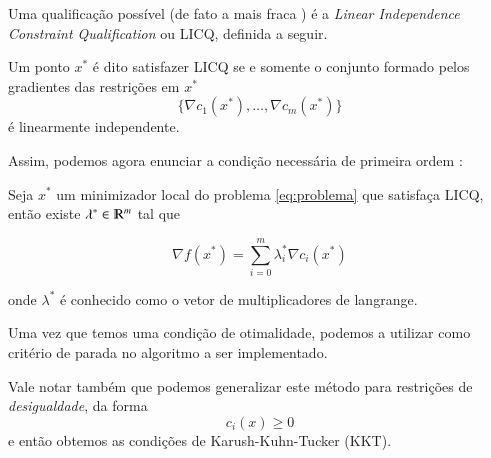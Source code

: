 Uma qualificação possível (de fato a mais fraca \citep{Wachsmuth201378}) é a
\emph{Linear Independence Constraint Qualification} ou LICQ, definida a seguir.

\begin{definition}
    Um ponto $x^*$ é dito satisfazer LICQ se e somente o conjunto formado pelos
    gradientes das restrições em $x^*$
    $$ \{ \nabla c_1(x^*), \dots, \nabla c_m(x^*)\} $$
    é linearmente independente.
\end{definition}

Assim, podemos agora enunciar a condição necessária de primeira ordem \citep{Friedlander94}:

\begin{theorem}
    Seja $x^*$ um minimizador local do problema \ref{eq:problema} que satisfaça LICQ,
    então existe $\lambda^* \in \varmathbb{R}^m$ tal que

    \begin{equation}
        \nabla f(x^*) = \sum_{i = 0}^{m} \lambda_i^* \nabla c_i(x^*)
    \end{equation}

    onde $\lambda^*$ é conhecido como o vetor de multiplicadores de langrange.
\end{theorem}

Uma vez que temos uma condição de otimalidade, podemos a utilizar como critério
de parada no algoritmo a ser implementado.

Vale notar também que podemos generalizar este método para restrições de \emph{desigualdade},
da forma
$$ c_i(x) \geq 0 $$
e então obtemos as condições de Karush-Kuhn-Tucker (KKT). \citep{Nocedal2006NO}
